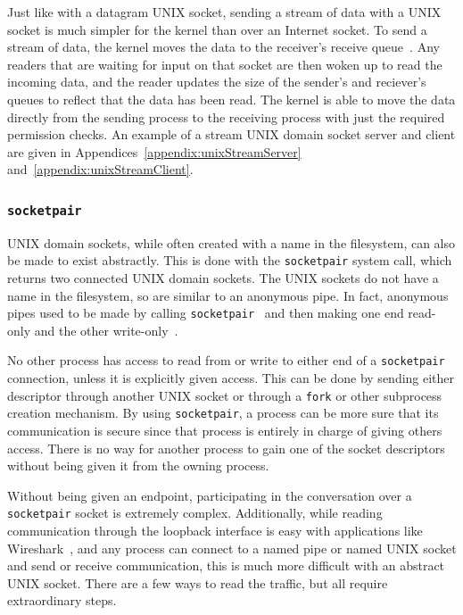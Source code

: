 Just like with a datagram UNIX socket, sending a stream of data with a UNIX socket is much simpler for the kernel than over an Internet socket.  To send a stream of data, the kernel moves the data to the receiver's receive queue~\cite[p 265--268]{Stevens:1996:TIT:233130}.  Any readers that are waiting for input on that socket are then woken up to read the incoming data, and the reader updates the size of the sender's and reciever's queues to reflect that the data has been read.  The kernel is able to move the data directly from the sending process to the receiving process with just the required permission checks.  An example of a stream UNIX domain socket server and client are given in Appendices~\ref{appendix:unixStreamServer} and~\ref{appendix:unixStreamClient}.

\subsubsection{\texttt{socketpair}}
\label{sec:socketpair}
UNIX domain sockets, while often created with a name in the filesystem, can also be made to exist abstractly.  This is done with the \texttt{socketpair} system call, which returns two connected UNIX domain sockets.  The UNIX sockets do not have a name in the filesystem, so are similar to an anonymous pipe.  In fact, anonymous pipes used to be made by calling \texttt{socketpair}~\cite{apple_2005} and then making one end read-only and the other write-only~\cite[p 253]{Stevens:1996:TIT:233130}.

No other process has access to read from or write to either end of a \texttt{socketpair} connection, unless it is explicitly given access.  This can be done by sending either descriptor through another UNIX socket or through a \texttt{fork} or other subprocess creation mechanism.  By using \texttt{socketpair}, a process can be more sure that its communication is secure since that process is entirely in charge of giving others access.  There is no way for another process to gain one of the socket descriptors without being given it from the owning process.

Without being given an endpoint, participating in the conversation over a \texttt{socketpair} socket is extremely complex.  Additionally, while reading communication through the loopback interface is easy with applications like Wireshark~\cite{wireshark}, and any process can connect to a named pipe or named UNIX socket and send or receive communication, this is much more difficult with an abstract UNIX socket.  There are a few ways to read the traffic, but all require extraordinary steps.

